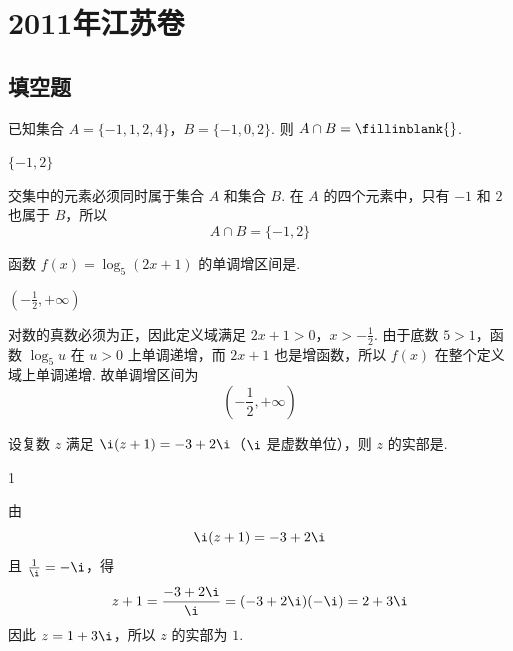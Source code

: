 \chapter{2011年江苏卷}

\section{填空题}

\begin{problem}
已知集合 \(A = \{-1, 1, 2, 4\}\)，\(B = \{-1, 0, 2\}\). 则 \(A \cap B =\fillinblank{}\).
\end{problem}

\begin{answer}
\(\{-1,2\}\)
\end{answer}

\begin{solution}
交集中的元素必须同时属于集合 \(A\) 和集合 \(B\). 在 \(A\) 的四个元素中，只有 \(-1\) 和 \(2\) 也属于 \(B\)，所以
\[
A\cap B=\{-1,2\}
\]
\end{solution}

\begin{problem}
函数 \(f(x)=\log_{5}(2x+1)\) 的单调增区间是\fillinblank{}.
\end{problem}

\begin{answer}
\(\left(-\frac{1}{2},+\infty\right)\)
\end{answer}

\begin{solution}
对数的真数必须为正，因此定义域满足
\(2x+1>0\)，\(x>-\frac{1}{2}\).
由于底数 \(5>1\)，函数 \(\log_{5}u\) 在 \(u>0\) 上单调递增，而 \(2x+1\) 也是增函数，所以 \(f(x)\) 在整个定义域上单调递增. 故单调增区间为
\[
\left(-\frac{1}{2},+\infty\right)
\]
\end{solution}

\begin{problem}
设复数 \(z\) 满足 \(\i(z+1)=-3+2\i\)（\(\i\) 是虚数单位），则 \(z\) 的实部是\fillinblank{}.
\end{problem}

\begin{answer}
1
\end{answer}

\begin{solution}
由
\[
\i(z+1)=-3+2\i
\]
且 \(\frac{1}{\i}=-\i\)，得
\[
z+1=\frac{-3+2\i}{\i}=(-3+2\i)(-\i)=2+3\i
\]
因此 \(z=1+3\i\)，所以 \(z\) 的实部为 \(1\).
\end{solution}

